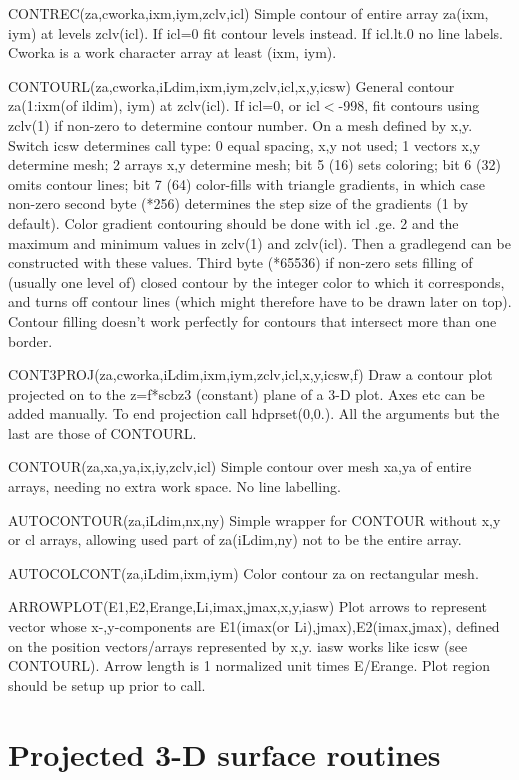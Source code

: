 \documentclass[12pt]{article}
\begin{document}
CONTREC(za,cworka,ixm,iym,zclv,icl) Simple contour of entire array za(ixm, iym)
at levels zclv(icl). If icl=0 fit contour levels instead. If icl.lt.0 no
line labels. Cworka is a work character array at least (ixm, iym).

CONTOURL(za,cworka,iLdim,ixm,iym,zclv,icl,x,y,icsw) General contour
za(1:ixm(of ildim), iym) at zclv(icl). If icl=0, or icl$<$-998, fit
contours using zclv(1) if non-zero to determine contour number. On a
mesh defined by x,y. Switch icsw determines call type: 0 equal
spacing, x,y not used; 1 vectors x,y determine mesh; 2 arrays x,y
determine mesh; bit 5 (16) sets coloring; bit 6 (32) omits contour
lines; bit 7 (64) color-fills with triangle gradients, in which case
non-zero second byte (*256) determines the step size of the gradients
(1 by default). Color gradient contouring should be done with icl
.ge. 2 and the maximum and minimum values in zclv(1) and
zclv(icl). Then a gradlegend can be constructed with these values.
Third byte (*65536) if non-zero sets filling of (usually one level of)
closed contour by the integer color to which it corresponds, and turns
off contour lines (which might therefore have to be drawn later on
top). Contour filling doesn't work perfectly for contours that
intersect more than one border.

CONT3PROJ(za,cworka,iLdim,ixm,iym,zclv,icl,x,y,icsw,f) Draw a contour
plot projected on to the z=f*scbz3 (constant) plane of a 3-D
plot. Axes etc can be added manually. To end projection call
hdprset(0,0.). All the arguments but the last are those of CONTOURL.

CONTOUR(za,xa,ya,ix,iy,zclv,icl) Simple contour over mesh xa,ya of entire
arrays, needing no extra work space. No line labelling.

AUTOCONTOUR(za,iLdim,nx,ny) Simple wrapper for CONTOUR without x,y 
or cl arrays, allowing used part of za(iLdim,ny) not to be the entire array.

AUTOCOLCONT(za,iLdim,ixm,iym) Color contour za on rectangular mesh.

ARROWPLOT(E1,E2,Erange,Li,imax,jmax,x,y,iasw) Plot arrows to represent
vector whose x-,y-components are E1(imax(or Li),jmax),E2(imax,jmax),
defined on the position vectors/arrays represented by x,y. iasw works
like icsw (see CONTOURL). Arrow length is 1 normalized unit times
E/Erange. Plot region should be setup up prior to
call.

\section{Projected 3-D surface routines}
\end{document}
